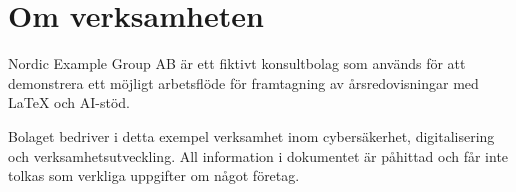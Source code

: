 \section{Om verksamheten}

Nordic Example Group AB är ett fiktivt konsultbolag som används för att demonstrera
ett möjligt arbetsflöde för framtagning av årsredovisningar med LaTeX och AI-stöd.

Bolaget bedriver i detta exempel verksamhet inom cybersäkerhet, digitalisering och
verksamhetsutveckling. All information i dokumentet är påhittad och får inte
tolkas som verkliga uppgifter om något företag.
